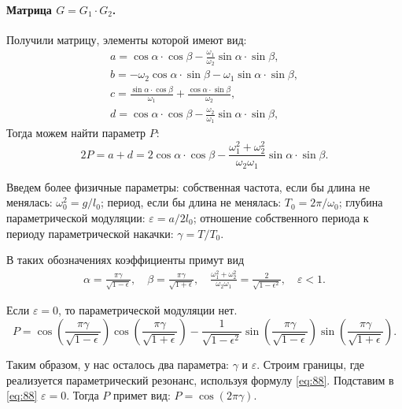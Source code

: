 \paragraph{Матрица $G=G_1\cdot G_2$. } Получили матрицу, элементы которой имеют вид:
\begin{gather*}
	a=\cos \alpha \cdot \cos \beta -\frac{\omega_1}{\omega_2} \sin \alpha \cdot \sin \beta, \\
	b=-\omega_2 \cos \alpha \cdot \sin \beta - \omega_1 \sin \alpha \cdot \sin \beta, \\
	c=\frac{\sin \alpha \cdot \cos \beta}{\omega_1}+\frac{\cos \alpha \cdot \sin \beta}{\omega_2}, \\
	d=\cos \alpha \cdot \cos \beta-\frac{\omega_2}{\omega_1}\sin \alpha \cdot \sin \beta,
\end{gather*}
Тогда можем найти параметр $P$:
\begin{equation}
	2P=a+d=2\cos \alpha\cdot \cos \beta - \frac{\omega_1^2+\omega_2^2}{\omega_2 \omega_1} \sin \alpha \cdot \sin \beta.
	\label{eq:87}	
\end{equation}

Введем более физичные параметры: собственная частота, если бы длина не менялась: $\omega_0^2=g/l_0$; период, если бы длина не менялась: $T_0=2\pi /\omega_0$; глубина параметрической модуляции: $\varepsilon=a/2l_0$; отношение собственного периода к периоду параметрической накачки: $\gamma=T/T_0$. 

В таких обозначениях коэффициенты примут вид
\begin{gather*}
	\alpha=\frac{\pi \gamma}{\sqrt{1-\epsilon}},\quad
	\beta=\frac{\pi \gamma}{\sqrt{1+\epsilon}},\quad
	\frac{\omega_1^2+\omega_2^2}{\omega_2 \omega_1}=\frac{2}{\sqrt{1-\epsilon^2}},\quad
	\varepsilon<1.
\end{gather*}

Если $\varepsilon=0$, то параметрической модуляции нет.
\begin{equation}
	P=\cos(\frac{\pi \gamma}{\sqrt{1-\epsilon}}) \cos (\frac{\pi \gamma}{\sqrt{1+\epsilon}}) - \frac{1}{\sqrt{1-\epsilon^2}} \sin(\frac{\pi \gamma}{\sqrt{1-\epsilon}}) \sin (\frac{\pi \gamma}{\sqrt{1+\epsilon}}).
	\label{eq:88}	
\end{equation}

Таким образом, у нас осталось два параметра: $\gamma$ и $\varepsilon$. Строим границы, где реализуется параметрический резонанс, используя формулу \eqref{eq:88}. Подставим в \eqref{eq:88} $\varepsilon=0$. Тогда $P$ примет вид: $P=\cos(2\pi \gamma)$.

